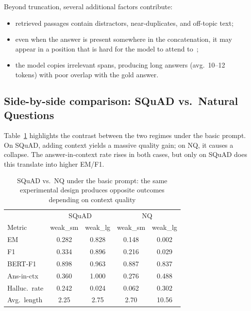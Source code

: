 \documentclass[a4paper,12pt]{article}
\begin{document}
Beyond truncation, several additional factors contribute:
\begin{itemize}
    \item retrieved passages contain distractors, near-duplicates, and off-topic text;
    \item even when the answer is present somewhere in the concatenation, it may appear in a position that is hard for the model to attend to~\cite{lost};
    \item the model copies irrelevant spans, producing long answers (avg.\ 10--12 tokens) with poor overlap with the gold answer.
\end{itemize}

\subsection{Side-by-side comparison: SQuAD vs.\ Natural Questions}
Table~\ref{tab:side_by_side} highlights the contrast between the two regimes under the basic prompt. On SQuAD, adding context yields a massive quality gain; on NQ, it causes a collapse. The answer-in-context rate rises in both cases, but only on SQuAD does this translate into higher EM/F1.

\begin{table}[H]
\centering
\caption{SQuAD vs.\ NQ under the basic prompt: the same experimental design produces opposite outcomes depending on context quality}
\label{tab:side_by_side}
\begin{tabular}{|l|cc|cc|}
\hline
& \multicolumn{2}{c|}{SQuAD} & \multicolumn{2}{c|}{NQ} \\
Metric & weak\_sm & weak\_lg & weak\_sm & weak\_lg \\
\hline
EM              & 0.282 & 0.828 & 0.148 & 0.002 \\
F1              & 0.334 & 0.896 & 0.216 & 0.029 \\
BERT-F1         & 0.898 & 0.963 & 0.887 & 0.837 \\
Ans-in-ctx      & 0.360 & 1.000 & 0.276 & 0.488 \\
Halluc.\ rate   & 0.242 & 0.024 & 0.062 & 0.302 \\
Avg.\ length    & 2.25  & 2.75  & 2.70  & 10.56 \\
\hline
\end{tabular}
\end{table}
\end{document}
